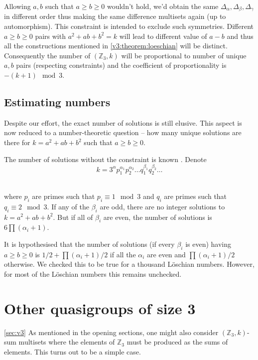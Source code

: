     \begin{remark}
        Allowing $a,b$ such that $a \geq b \geq 0$ wouldn't hold, we'd obtain the same $\Delta_\alpha, \Delta_\beta, \Delta_\gamma$ in different order thus making the same difference multisets again (up to automorphism). This constraint is intended to exclude such symmetries.
        Different $a \geq b \geq 0$ pairs with $a^2+ab+b^2=k$ will lead to different value of $a-b$ and thus all the constructions mentioned in \ref{v3:theorem:loeschian} will be distinct. Consequently the number of $(\mathbb Z_3,k)$ will be proportional to number of unique $a,b$ pairs (respecting constraints) and the coefficient of proportionality is $-(k+1) \mod 3$.
    \end{remark}

    \subsection{Estimating numbers}
        Despite our effort, the exact number of solutions is still elusive. This aspect is now reduced to a number-theoretic question -- how many unique solutions are there for $k=a^2+ab+b^2$ such that $a\geq b\geq 0$.

        The number of solutions without the constraint is known \cite{marmon2005hexagonal}. Denote
        \begin{equation}
            k=3^\alpha p_1^{\alpha_1}p_2^{\alpha_2}\ldots q_1^{\beta_1}q_2^{\beta_2}\ldots
        \end{equation}\
        
        where $p_i$ are primes such that $p_i \equiv 1 \mod 3$ and $q_i$ are primes such that $q_i \equiv 2 \mod 3$. If any of the $\beta_i$ are odd, there are no integer solutions to $k=a^2+ab+b^2$. But if all of $\beta_i$ are even, the number of solutions is $6\prod (\alpha_i +1)$.
        
        It is hypothesised \cite{nair2004elementary} that the number of solutions (if every $\beta_i$ is even) having $a \geq b \geq 0$ is $1/2 + \prod (\alpha_i +1)/2$ if all the $\alpha_i$ are even and $\prod (\alpha_i +1)/2$ otherwise. We checked this to be true for a thousand Löschian numbers. However, for most of the Löschian numbers this remains unchecked.

\section{Other quasigroups of size 3}
    \ref{sec:v3}
    As mentioned in the opening sections, one might also consider $(\mathbb Z_3,k)$-sum multisets where the elements of $\mathbb Z_3$ must be produced as the sums of elements. This turns out to be a simple case.

